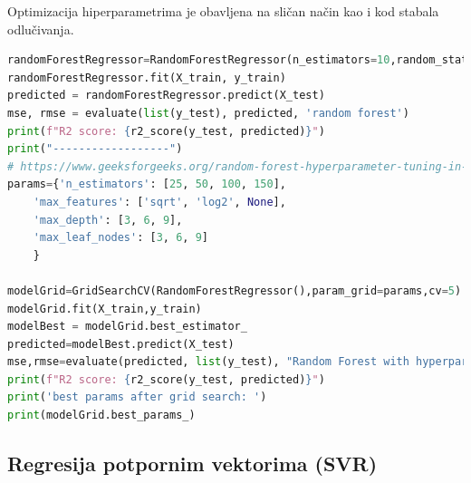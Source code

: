 \documentclass[fontsize=12bp, paper=a4]{scrarticle}
\begin{document}
Optimizacija hiperparametrima je obavljena na sličan način kao i kod stabala odlučivanja.
\begin{lstlisting}[language=Python, caption=\centering Postupak slučajnih šuma bez i sa optimizacijom hiperparametrima]
randomForestRegressor=RandomForestRegressor(n_estimators=10,random_state=0)
randomForestRegressor.fit(X_train, y_train)
predicted = randomForestRegressor.predict(X_test)
mse, rmse = evaluate(list(y_test), predicted, 'random forest')
print(f"R2 score: {r2_score(y_test, predicted)}")
print("------------------")
# https://www.geeksforgeeks.org/random-forest-hyperparameter-tuning-in-python/
params={'n_estimators': [25, 50, 100, 150], 
    'max_features': ['sqrt', 'log2', None], 
    'max_depth': [3, 6, 9], 
    'max_leaf_nodes': [3, 6, 9]
 	}
            
modelGrid=GridSearchCV(RandomForestRegressor(),param_grid=params,cv=5)
modelGrid.fit(X_train,y_train)
modelBest = modelGrid.best_estimator_
predicted=modelBest.predict(X_test)
mse,rmse=evaluate(predicted, list(y_test), "Random Forest with hyperparameter optimization")
print(f"R2 score: {r2_score(y_test, predicted)}")
print('best params after grid search: ')
print(modelGrid.best_params_)
\end{lstlisting}


\subsection{Regresija potpornim vektorima (SVR)}
\end{document}

